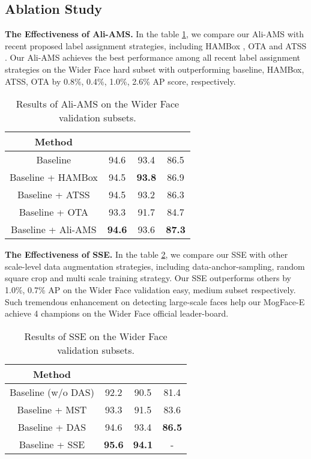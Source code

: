 \documentclass[10pt,twocolumn,letterpaper]{article}
\begin{document}
\subsection{Ablation Study}
\noindent\textbf{The Effectiveness of Ali-AMS.} In the table \ref{table_5}, we 
compare our Ali-AMS with recent proposed label assignment strategies, including HAMBox \cite{liu2019hambox}, OTA \cite{ge2021ota} and ATSS \cite{zhang2020bridging}.  Our Ali-AMS achieves the best performance among all recent label assignment strategies on the Wider Face hard subset with outperforming baseline, HAMBox, ATSS, OTA by 0.8\%, 0.4\%, 1.0\%, 2.6\% AP score, respectively.

\begin{table}[h]
\small
\renewcommand\arraystretch{1.1}
	\begin{center}
	\setlength{\tabcolsep}{10pt}
	\begin{tabular}{c|ccc}
		\hline
		Method   &   &  &  \\
		\hline
        Baseline  &94.6  &93.4 & 86.5 \\
        Baseline + HAMBox  &94.5  &\textbf{93.8} & 86.9 \\
        Baseline + ATSS &94.5	&93.2	&86.3 \\
        Baseline + OTA &93.3  &91.7 & 84.7 \\
        Baseline + Ali-AMS  &\textbf{94.6}  &93.6 & \textbf{87.3}\\   
		\hline				
	\end{tabular}
	\end{center}
\vspace{-10pt}
\caption{Results of Ali-AMS on the Wider Face validation subsets.
}
\label{table_5}
\end{table}
\noindent\textbf{The Effectiveness of SSE.} In the table \ref{table_6}, we compare our SSE with other scale-level data augmentation strategies, including data-anchor-sampling, random square crop and multi scale training strategy. Our SSE outperforms others by 1.0\%, 0.7\% AP on the Wider Face validation easy, medium subset respectively. Such tremendous enhancement on detecting large-scale faces help our MogFace-E achieve 4 champions on the Wider Face official leader-board.
\begin{table}[h]
\small
\renewcommand\arraystretch{1.1}
	\begin{center}
	\setlength{\tabcolsep}{10pt}
	\begin{tabular}{c|ccc}
		\hline
		Method   &   &  &  \\
		\hline
        Baseline (w/o DAS)  &92.2	& 90.5 & 81.4 \\
        Baseline + MST &93.3	& 91.5	&83.6 \\
        Baseline + DAS &94.6  &93.4 & \textbf{86.5} \\
        Baseline + SSE  &\textbf{95.6}  &\textbf{94.1} & - \\   
		\hline				
	\end{tabular}
	\end{center}
\vspace{-10pt}
\caption{Results of SSE on the Wider Face validation subsets.
}
\label{table_6}
\end{table}
\end{document}
